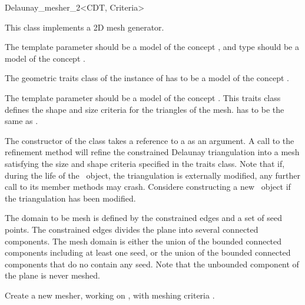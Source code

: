 \begin{ccRefClass}{Delaunay_mesher_2<CDT, Criteria>}

This class implements a 2D mesh generator.

\ccParameters The template parameter  should be a model of the
concept , and type 
should be a model of the concept .

The geometric traits class of the instance of  has to be
a model of the concept .

The template parameter  should be a model of the concept
. This traits class defines the shape and size
criteria for the triangles of the mesh.  has to
be the same as .


The constructor of the class \ccRefName{} takes a reference to a 
as an argument. A call to the refinement method  will
refine the constrained Delaunay triangulation into a mesh satisfying the
size and shape criteria specified in the traits class. Note that if, during
the life of the \ccRefName\ object, the triangulation is externally
modified, any further call to its member methods may crash. Considere
constructing a new \ccRefName\ object if the triangulation has been
modified.


The domain to be mesh is defined by the constrained edges and a set of seed
points. The constrained edges divides the plane into several connected
components.  The mesh domain is either the union of the bounded connected
components including at least one seed, or the union of the bounded
connected components that do no contain any seed. Note that the unbounded
component of the plane is never meshed.


\ccTypes 
{}

\ccCreation
{}

{Create a new mesher, working on , with meshing criteria
  .}


\end{ccRefClass}
